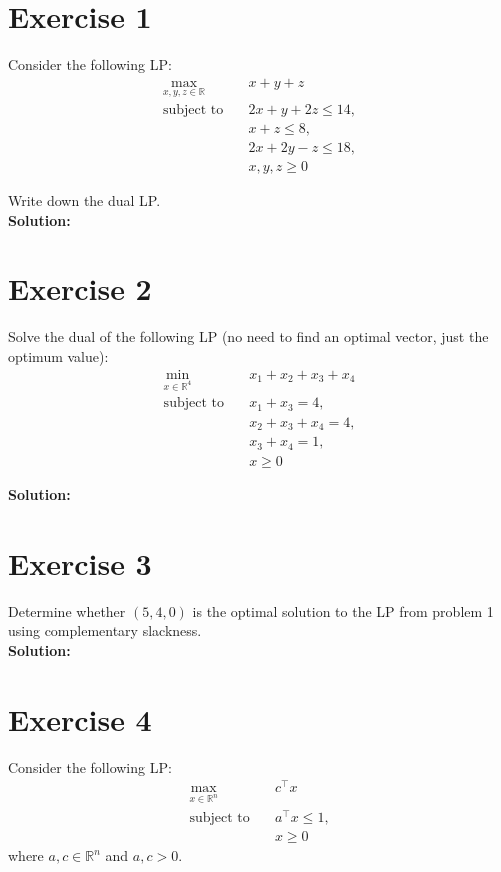 \documentclass{article}
\begin{document}
\section*{Exercise 1}
Consider the following LP:
\begin{align*}
\max_{x, y, z \in \mathbb{R}} \quad & x + y + z \\
\text{subject to} \quad & 2x + y + 2z \leq 14, \\
& x + z \leq 8, \\
& 2x + 2y - z \leq 18, \\
& x, y, z \geq 0
\end{align*}

Write down the dual LP. \\

\textbf{Solution:}



\newpage

\section*{Exercise 2}
Solve the dual of the following LP (no need to find an optimal vector, just the optimum value):
\begin{align*}
\min_{x \in \mathbb{R}^4} \quad & x_1 + x_2 + x_3 + x_4 \\
\text{subject to} \quad & x_1 + x_3 = 4, \\
& x_2 + x_3 + x_4 = 4, \\
& x_3 + x_4 = 1, \\
& x \geq 0
\end{align*}

\textbf{Solution:}



\newpage

\section*{Exercise 3}
Determine whether $(5, 4, 0)$ is the optimal solution to the LP from problem 1 using complementary slackness. \\

\textbf{Solution:}



\newpage

\section*{Exercise 4}
Consider the following LP:
\begin{align*}
\max_{x \in \mathbb{R}^n} \quad & c^{\top} x \\
\text{subject to} \quad & a^{\top} x \leq 1, \\
& x \geq 0
\end{align*}
where $a, c \in \mathbb{R}^n$ and $a, c > 0$.
\end{document}
